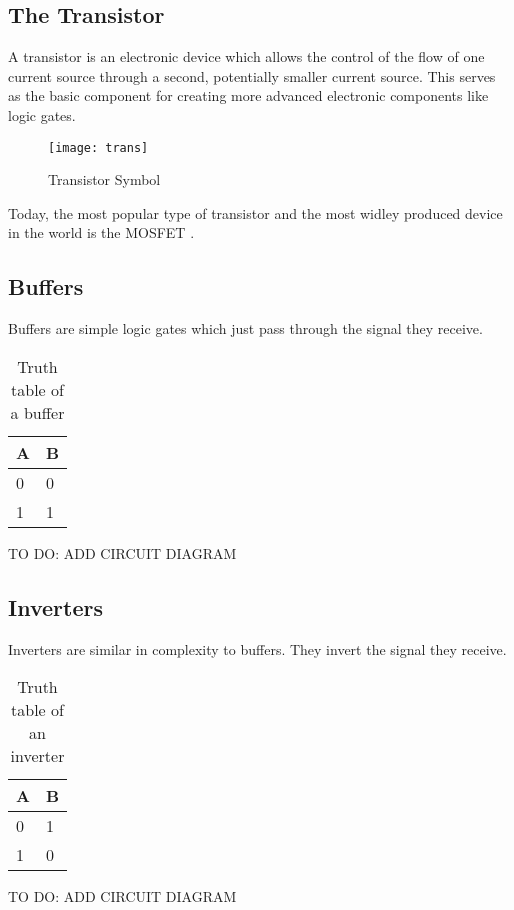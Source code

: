\subsection{The Transistor}
A transistor is an electronic device which allows the control of the flow of one current source through a second, potentially smaller current source. This serves as the basic component for creating more advanced electronic components like logic gates.
\begin{figure}[h]
  \centering
  \texttt{[image: trans]}
  \caption{Transistor Symbol}
  \label{trans}
\end{figure}
Today, the most popular type of transistor and the most widley produced device in the world is the MOSFET \cite{chm2019mosfet}.


\subsection{Buffers}
Buffers are simple logic gates which just pass through the signal they receive.
\begin{table}[H]
\centering
\begin{tabular}{l|l}
\hline
\multicolumn{1}{|l|}{\textbf{A}} & \multicolumn{1}{l|}{\textbf{B}} \\ \hline
0                                & 0                               \\
1                                & 1
\end{tabular}
\caption{Truth table of a buffer}
\label{tab:buffer-table}
\end{table}
TO DO: ADD CIRCUIT DIAGRAM

\subsection{Inverters}
Inverters are similar in complexity to buffers. They invert the signal they receive.
\begin{table}[H]
\centering
\begin{tabular}{l|l}
\hline
\multicolumn{1}{|l|}{\textbf{A}} & \multicolumn{1}{l|}{\textbf{B}} \\ \hline
0                                & 1                               \\
1                                & 0
\end{tabular}
\caption{Truth table of an inverter}
\label{tab:inverter-table}
\end{table}
TO DO: ADD CIRCUIT DIAGRAM

